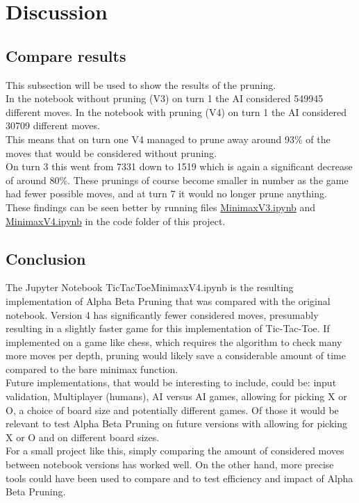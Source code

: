 \section{Discussion} 
\label{sec:Discussion}

\subsection{Compare results}
This subsection will be used to show the results of the pruning.\\
In the notebook without pruning (V3) on turn 1 the AI considered 549945 different moves.
In the notebook with pruning (V4) on turn 1 the AI considered 30709 different moves.\\
This means that on turn one V4 managed to prune away around 93\% of the moves that would be considered without pruning.\\
On turn 3 this went from 7331 down to 1519 which is again a significant decrease of around 80\%.
These prunings of course become smaller in number as the game had fewer possible moves, and at turn 7 it would no longer prune anything.\\
These findings can be seen better by running files \href{code/TicTacToe_MinimaxV3.ipynb}{MinimaxV3.ipynb} 
and \href{code/TicTacToe_MinimaxV4.ipynb}{MinimaxV4.ipynb} in the code folder of this project.

\subsection{Conclusion}
The Jupyter Notebook TicTacToe\textunderscore MinimaxV4.ipynb is the resulting implementation of 
Alpha Beta Pruning that was compared with the original notebook.
Version 4 has significantly fewer considered moves, presumably resulting in a slightly faster game 
for this implementation of Tic-Tac-Toe.
If implemented on a game like chess, which requires the algorithm to check many more moves per depth, 
pruning would likely save a considerable amount of time compared to the bare minimax function.\\
Future implementations, that would be interesting to include, could be: input validation, Multiplayer (humans), AI versus AI games, allowing for picking X or O, 
a choice of board size and potentially different games. Of those it would be relevant to test Alpha Beta Pruning on future versions 
with allowing for picking X or O and on different board sizes.\\
For a small project like this, simply comparing the amount of considered moves between notebook versions has worked well.
On the other hand, more precise tools could have been used to compare and to test efficiency and impact of Alpha Beta Pruning.